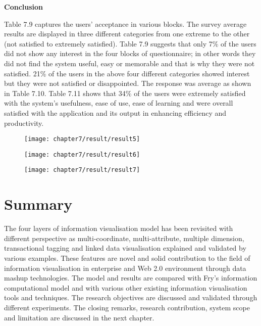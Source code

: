 \textbf{Conclusion}

Table 7.9 captures the users’ acceptance in various blocks. The survey average results are displayed in three different categories from one extreme to the other (not satisfied to extremely satisfied). Table 7.9 suggests that only 7\% of the users did not show any interest in the four blocks of questionnaire; in other words they did not find the system useful, easy or memorable and that is why they were not satisfied. 21\% of the users in the above four different categories showed interest but they were not satisfied or disappointed. The response was average as shown in Table 7.10. Table 7.11 shows that 34\% of the users were extremely satisfied with the system’s usefulness, ease of use, ease of learning and were overall satisfied with the application and its output in enhancing efficiency and productivity.  


\begin{figure}
\centering
\texttt{[image: chapter7/result/result5]}
\end{figure}

\begin{figure}
\centering
\texttt{[image: chapter7/result/result6]}
\end{figure}

\begin{figure}
\centering
\texttt{[image: chapter7/result/result7]}
\end{figure}


\section{Summary}

The four layers of information visualisation model has been revisited with different perspective as multi-coordinate, multi-attribute, multiple dimension, transactional tagging and linked data visualisation explained and validated by various examples. These features are novel and solid contribution to the field of information visualisation in enterprise and Web 2.0 environment through data mashup technologies. The model and results are compared with Fry's \cite{fry} information computational model and with various other existing information visualisation tools and techniques. The research objectives are discussed and validated through different experiments. The closing remarks, research contribution, system scope and limitation are discussed in the next chapter.







